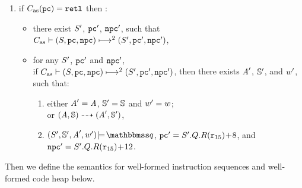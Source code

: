 \begin{definition}
\begin{enumerate}[1.]
        \item if {\em $\asmimp(\pc) = \retl$} then :
            \begin{itemize}
                \item there exist $\state'$, {\em $\pc'$}, {\em $\npc'$}, such that
                \\
                {\em $\multilptrans{\asmimp}{2}{(\state, \pc, \npc)}
                    {(\state', \pc', \npc')}$},

                \item for any {\em $\state'$}, {\em $\pc'$} 
                and {\em $\npc'$}, \\
                if
                {\em $\multilptrans{\asmimp}{2}{(\state, \pc, \npc)}{(\state', \pc', \npc')}$},
                then there exists {\em $\primcom'$}, {\em $\hpstate'$}, and {\em $\word'$},
                such that:
                \begin{enumerate}[(1)]
                    \item either $\primcom' = \primcom$,
                    $\hpstate' = \hpstate$ and $\word' = \word$; \\
                    or
                    $\primTrans{(\primcom, \hpstate)}
                        {(\primcom', \hpstate')}$,
                    \item $\asrtmodel{(\state', \hpstate', \primcom', \word')}
                        {\relastQ}$,
                        {\em $\pc' = \state'.\Rstate.\RFile(\reg{15}) \!+\! 8$},
                        and
                        {\em $\npc' = \state'.\Rstate.\RFile(\reg{15}) \!+\! 12$}.
                \end{enumerate}
            \end{itemize}
    \end{enumerate}
\end{definition}

Then we define the semantics for well-formed instruction
sequences and well-formed code heap below.

